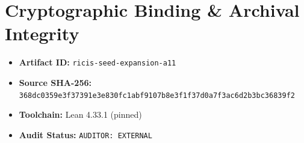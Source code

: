 \documentclass[11pt,a4paper]{article}
\begin{document}
\section{Cryptographic Binding & Archival Integrity}
\begin{itemize}
  \item \textbf{Artifact ID:} \texttt{ricis-seed-expansion-a11}
  \item \textbf{Source SHA-256:} \texttt{368dc0359e3f37391e3e830fc1abf9107b8e3f1f37d0a7f3ac6d2b3bc36839f2}
  \item \textbf{Toolchain:} Lean 4.33.1 (pinned)
  \item \textbf{Audit Status:} \texttt{AUDITOR: EXTERNAL}
\end{itemize}
\end{document}
